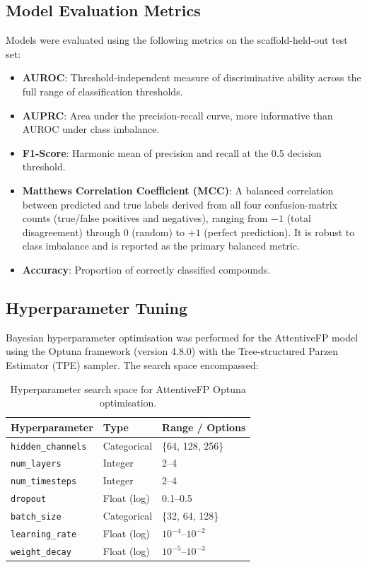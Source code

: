 \subsection{Model Evaluation Metrics}

Models were evaluated using the following metrics on the scaffold-held-out test set:

\begin{itemize}
    \item \textbf{AUROC}: Threshold-independent measure of discriminative ability
          across the full range of classification thresholds.
    \item \textbf{AUPRC}: Area under the precision-recall curve, more informative
          than AUROC under class imbalance.
    \item \textbf{F1-Score}: Harmonic mean of precision and recall at the 0.5
          decision threshold.
    \item \textbf{Matthews Correlation Coefficient (MCC)}: A balanced correlation
          between predicted and true labels derived from all four confusion-matrix
          counts (true/false positives and negatives), ranging from $-1$ (total
          disagreement) through $0$ (random) to $+1$ (perfect prediction). It is
          robust to class imbalance and is reported as the primary balanced metric.
    \item \textbf{Accuracy}: Proportion of correctly classified compounds.
\end{itemize}

\subsection{Hyperparameter Tuning}

Bayesian hyperparameter optimisation was performed for the AttentiveFP model using
the Optuna framework (version 4.8.0) with the Tree-structured Parzen Estimator (TPE)
sampler. The search space encompassed:

\begin{table}[H]
\centering
\caption{Hyperparameter search space for AttentiveFP Optuna optimisation.}
\label{tab:search}
\begin{tabular}{lll}
\toprule
\textbf{Hyperparameter} & \textbf{Type} & \textbf{Range / Options} \\
\midrule
\texttt{hidden\_channels}  & Categorical   & \{64, 128, 256\}           \\
\texttt{num\_layers}       & Integer       & 2--4                        \\
\texttt{num\_timesteps}    & Integer       & 2--4                        \\
\texttt{dropout}           & Float (log)   & 0.1--0.5                    \\
\texttt{batch\_size}       & Categorical   & \{32, 64, 128\}             \\
\texttt{learning\_rate}    & Float (log)   & $10^{-4}$--$10^{-2}$        \\
\texttt{weight\_decay}     & Float (log)   & $10^{-5}$--$10^{-3}$        \\
\bottomrule
\end{tabular}
\end{table}

